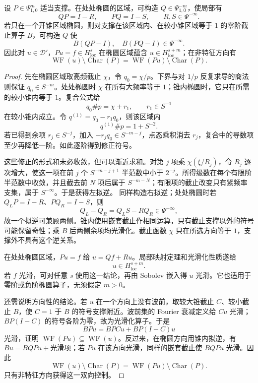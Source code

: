 \begin{theorem}[拟逆与椭圆正则性]
设 $P\in\Psi^m_{1,0}$ 适当支撑。在处处椭圆的区域，可构造 $Q\in\Psi^{-m}_{1,0}$，使局部有
\[
QP=I-R,\qquad PQ=I-S,\qquad R,S\in\Psi^{-\infty}.
\]
若只在一个开锥区域椭圆，则对支撑在该区域内、在较小锥区域等于 $1$ 的零阶截止算子 $B$，可构造 $Q$ 使
\[
B(QP-I),\quad B(PQ-I)\in\Psi^{-\infty}.
\]
因此对 $u\in\mathcal D'$，$Pu=f\in H^s_{\mathrm{loc}}$ 在椭圆区域蕴含 $u\in H^{s+m}_{\mathrm{loc}}$；在非特征方向有
\[
\operatorname{WF}(u)\setminus\operatorname{Char}(P)
=\operatorname{WF}(Pu)\setminus\operatorname{Char}(P).
\]
\end{theorem}
\begin{proof}
先在椭圆区域取高频截止 $\chi$，令 $q_0=\chi/p$。下界与对 $1/p$ 反复求导的商法则保证 $q_0\in S^{-m}$。处处椭圆时 $\chi$ 在所有大频率等于 $1$；锥内椭圆时，它只在所需的较小锥内等于 $1$。复合公式给
\[
q_0\#p=\chi+r_1,\qquad r_1\in S^{-1}
\]
在较小锥内成立。令 $q^{(1)}=q_0-r_1q_0$，则该区域内
\[
q^{(1)}\#p=1+S^{-2}.
\]
若已得到余项 $r_j\in S^{-j}$，加入 $-r_jq_0\in S^{-m-j}$，点态乘积消去 $r_j$，复合中的导数项至少再降低一阶。如此逐阶得到修正符号。

这些修正的形式和未必收敛，但可以渐近求和。对第 $j$ 项乘 $\chi(\xi/R_j)$，令 $R_j$ 逐次增大，使这一项在前 $j$ 个 $S^{-m-j+1}$ 半范数中小于 $2^{-j}$。所得级数在每个有限阶半范数中收敛，并且截去前 $N$ 项后属于 $S^{-m-N}$；有限项的截止改变只有紧频率支集，属于 $S^{-\infty}$。于是获得左拟逆。
同样构造右拟逆；处处椭圆时若 $Q_LP=I-R$、$PQ_R=I-S$，则
\[
Q_L-Q_R=Q_LS-RQ_R\in\Psi^{-\infty},
\]
故一个拟逆可兼顾两侧。锥内使用嵌套截止作相同运算，只有截止支撑以外的符号可能保留奇性；乘 $B$ 后两侧余项均光滑化。截止函数 $\chi$ 只在所选方向等于 $1$，支撑外不具有这个逆关系。

在处处椭圆区域，$Pu=f$ 给 $u=Qf+Ru$。局部映射定理和光滑化性质遂给
\begin{equation}
u\in H^{s+m}_{\mathrm{loc}}.
\label{eq:math-dist-elliptic-sobolev-regularity}
\end{equation}
若 $f$ 光滑，可对任意 $s$ 使用这一结论，再由 Sobolev 嵌入得 $u$ 光滑。它也适用于零阶或负阶椭圆算子，无须假定 $m>0$。

还需说明方向性的结论。若 $u$ 在一个方向上没有波前，取较大锥截止 $C$、较小截止 $B$，使 $C=1$ 于 $B$ 的符号支撑附近。波前集的 Fourier 衰减定义给 $Cu$ 光滑；$BP(I-C)$ 的符号各阶为零，故为光滑化算子。于是
\[
BPu=BPCu+BP(I-C)u
\]
光滑，证明 $\operatorname{WF}(Pu)\subseteq\operatorname{WF}(u)$。反过来，在椭圆方向用锥内拟逆，有 $Bu=BQPu+\text{光滑项}$；若 $Pu$ 在该方向光滑，同样的嵌套截止使 $BQPu$ 光滑。因此
\begin{equation}
\operatorname{WF}(u)\setminus\operatorname{Char}(P)
=\operatorname{WF}(Pu)\setminus\operatorname{Char}(P).
\label{eq:math-dist-wavefront-elliptic-regularity}
\end{equation}
只有非特征方向获得这一双向控制。
\end{proof}

